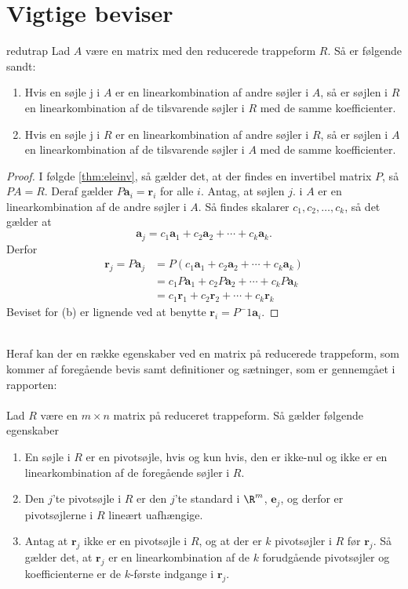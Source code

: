 \chapter{Vigtige beviser}

\begin{thm}{}{redutrap}
Lad $A$ være en matrix med den reducerede trappeform $R$. Så er følgende sandt:
\begin{enumerate}[label=(\alph*)]
\item  Hvis en søjle j i $A$ er en linearkombination  af andre søjler i $A$, så er søjlen i $R$ en linearkombination af de tilsvarende søjler i $R$ med de samme koefficienter.
\item  Hvis en søjle j i $R$ er en linearkombination  af andre søjler i $R$, så er søjlen i $A$ en linearkombination af de tilsvarende søjler i $A$ med de samme koefficienter.
\end{enumerate}
\end{thm}%
\begin{proof}
I følgde \ref{thm:eleinv}, så gælder det, at der findes en invertibel matrix $P$, så $PA=R$. Deraf gælder $P\textbf{a}_i=\textbf{r}_i$ for alle $i$. Antag, at søjlen $j$. i $A$ er en linearkombination af de andre søjler i $A$. Så findes skalarer $c_1,c_2,\ldots,c_k$, så det gælder at \\
\begin{equation}
\textbf{a}_j=c_1\textbf{a}_1+c_2\textbf{a}_2+\cdots+c_k\textbf{a}_k.
\end{equation}
Derfor 
\begin{align*}
\textbf{r}_j=P\textbf{a}_j&=P(c_1\textbf{a}_1+c_2\textbf{a}_2+\cdots+c_k\textbf{a}_k) \\
&= c_1P\textbf{a}_1+c_2P\textbf{a}_2+\cdots+c_kP\textbf{a}_k\\
&= c_1\textbf{r}_1+c_2\textbf{r}_2+\cdots+c_k\textbf{r}_k
\end{align*}
Beviset for (b) er lignende ved at benytte $\textbf{r}_i=P^-1\textbf{a}_i.$
\end{proof} \\
%
Heraf kan der en række egenskaber ved en matrix på reducerede trappeform, som kommer af foregående bevis samt definitioner og sætninger, som er gennemgået i rapporten: \\\\
%
Lad $R$ være en $m \times n$ matrix på reduceret trappeform. Så gælder følgende egenskaber
\begin{enumerate}[label=(\alph*)]
\item En søjle i $R$ er en pivotsøjle, hvis og kun hvis, den er ikke-nul og ikke er en linearkombination af de foregående søjler i $R$. 
\item Den $j$'te pivotsøjle i $R$ er den $j$'te standard i $\R^m$, $\textbf{e}_j$, og derfor er pivotsøjlerne i $R$ lineært uafhængige. 
\item Antag at $\textbf{r}_j$ ikke er en pivotsøjle i $R$, og at der er $k$ pivotsøjler i $R$ før $\textbf{r}_j$. Så gælder det, at $\textbf{r}_j$ er en linearkombination af de $k$ forudgående pivotsøjler og koefficienterne er de $k$-første indgange i $\textbf{r}_j$. 
\end{enumerate}
